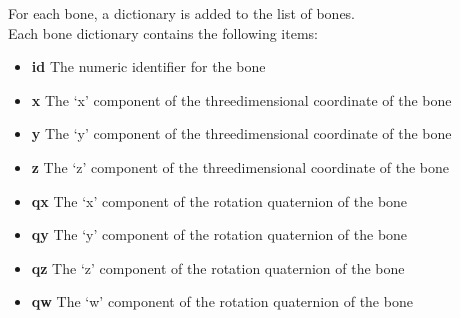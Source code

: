 For each bone, a dictionary is added to the list of bones.\\

Each bone dictionary contains the following items:
\begin{itemize}
\item \textbf{id} \longDash{} The numeric identifier for the bone
\item\exSp\textbf{x} \longDash{} The `x' component of the three\longDash{}dimensional
coordinate of the bone
\item\exSp\textbf{y} \longDash{} The `y' component of the three\longDash{}dimensional
coordinate of the bone
\item\exSp\textbf{z} \longDash{} The `z' component of the three\longDash{}dimensional
coordinate of the bone
\item\exSp\textbf{qx} \longDash{} The `x' component of the rotation quaternion of the bone
\item\exSp\textbf{qy} \longDash{} The `y' component of the rotation quaternion of the bone
\item\exSp\textbf{qz} \longDash{} The `z' component of the rotation quaternion of the bone
\item\exSp\textbf{qw} \longDash{} The `w' component of the rotation quaternion of the bone
\end{itemize}
\primaryEnd{}
